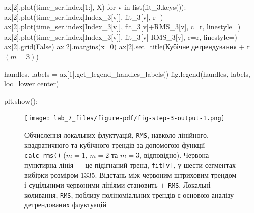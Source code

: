 \documentclass[
  letterpaper,
]{report}
\newenvironment{Shaded}{\begin{snugshade}}{\end{snugshade}}
\newcommand{\BuiltInTok}[1]{\textcolor[rgb]{0.00,0.23,0.31}{#1}}
\newcommand{\ControlFlowTok}[1]{\textcolor[rgb]{0.00,0.23,0.31}{#1}}
\newcommand{\DecValTok}[1]{\textcolor[rgb]{0.68,0.00,0.00}{#1}}
\newcommand{\KeywordTok}[1]{\textcolor[rgb]{0.00,0.23,0.31}{#1}}
\newcommand{\NormalTok}[1]{\textcolor[rgb]{0.00,0.23,0.31}{#1}}
\newcommand{\OperatorTok}[1]{\textcolor[rgb]{0.37,0.37,0.37}{#1}}
\newcommand{\StringTok}[1]{\textcolor[rgb]{0.13,0.47,0.30}{#1}}
\newcommand{\VariableTok}[1]{\textcolor[rgb]{0.07,0.07,0.07}{#1}}
\newcommand{\VerbatimStringTok}[1]{\textcolor[rgb]{0.13,0.47,0.30}{#1}}
\begin{document}
\begin{Shaded}
\begin{Highlighting}[]
\NormalTok{ax[}\DecValTok{2}\NormalTok{].plot(time\_ser.index[}\DecValTok{1}\NormalTok{:], X)}
\ControlFlowTok{for}\NormalTok{ v }\KeywordTok{in} \BuiltInTok{list}\NormalTok{(fit\_3.keys()):}
\NormalTok{    ax[}\DecValTok{2}\NormalTok{].plot(time\_ser.index[Index\_3[v]], fit\_3[v], }\StringTok{\textquotesingle{}r{-}{-}\textquotesingle{}}\NormalTok{)}
\NormalTok{    ax[}\DecValTok{2}\NormalTok{].plot(time\_ser.index[Index\_3[v]], fit\_3[v]}\OperatorTok{+}\NormalTok{RMS\_3[v], c}\OperatorTok{=}\StringTok{\textquotesingle{}r\textquotesingle{}}\NormalTok{, linestyle}\OperatorTok{=}\StringTok{\textquotesingle{}{-}\textquotesingle{}}\NormalTok{)}
\NormalTok{    ax[}\DecValTok{2}\NormalTok{].plot(time\_ser.index[Index\_3[v]], fit\_3[v]}\OperatorTok{{-}}\NormalTok{RMS\_3[v], c}\OperatorTok{=}\StringTok{\textquotesingle{}r\textquotesingle{}}\NormalTok{, linestyle}\OperatorTok{=}\StringTok{\textquotesingle{}{-}\textquotesingle{}}\NormalTok{)}
\NormalTok{ax[}\DecValTok{2}\NormalTok{].grid(}\VariableTok{False}\NormalTok{)}
\NormalTok{ax[}\DecValTok{2}\NormalTok{].margins(x}\OperatorTok{=}\DecValTok{0}\NormalTok{)}
\NormalTok{ax[}\DecValTok{2}\NormalTok{].set\_title(}\StringTok{\textquotesingle{}Кубічне детрендування \textquotesingle{}} \OperatorTok{+} \VerbatimStringTok{r\textquotesingle{}$(m=3)$\textquotesingle{}}\NormalTok{)}

\NormalTok{handles, labels }\OperatorTok{=}\NormalTok{ ax[}\DecValTok{1}\NormalTok{].get\_legend\_handles\_labels()}
\NormalTok{fig.legend(handles, labels, loc}\OperatorTok{=}\StringTok{\textquotesingle{}lower center\textquotesingle{}}\NormalTok{)}

\NormalTok{plt.show()}\OperatorTok{;}
\end{Highlighting}
\end{Shaded}

\begin{figure}[H]

{\centering \texttt{[image: lab\_7\_files/figure-pdf/fig-step-3-output-1.png]}

}

\caption{\label{fig-step-3}Обчислення локальних флуктуацій,
\texttt{RMS}, навколо лінійного, квадратичного та кубічного трендів за
допомогою функції \texttt{calc\_rms()} (\(m = 1\), \(m = 2\) та
\(m = 3\), відповідно). Червона пунктирна лінія --- це підігнаний тренд,
\texttt{fit{[}v{]}}, у шести сегментах вибірки розміром 1335. Відстань
між червоним штриховим трендом і суцільними червоними лініями становить
\(\pm\) \texttt{RMS}. Локальні коливання, \texttt{RMS}, поблизу
поліноміальних трендів є основою аналізу детрендованих флуктуацій}

\end{figure}
\end{document}
